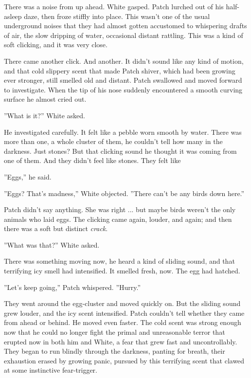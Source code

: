 \documentclass[12pt]{book}
\begin{document}
There was a noise from up ahead. White gasped. Patch lurched out of his half-asleep daze, then froze stiffly into place. This wasn't one of the usual underground noises that they had almost gotten accustomed to %
whispering drafts of air, the slow dripping of water, occasional distant rattling. This was a kind of soft clicking, and it was very close. 

There came another click. And another. It didn't sound like any kind of motion, and that cold slippery scent that made Patch shiver, which had been growing ever stronger, still smelled old and distant. Patch swallowed and moved forward to investigate. When the tip of his nose suddenly encountered a smooth curving surface he almost cried out.

''What is it?'' White asked.

He investigated carefully. It felt like a pebble worn smooth by water. There was more than one, a whole cluster of them, he couldn't tell how many in the darkness. Just stones? But that clicking sound %
he thought it was coming from one of them. And they didn't feel like stones. They felt like %

''Eggs,'' he said.

''Eggs? That's madness,'' White objected. ''There can't be any birds down here.''

Patch didn't say anything. She was right ... but maybe birds weren't the only animals who laid eggs. The clicking came again, louder, and again; and then there was a soft but distinct {\it crack}.

''What was that?'' White asked.

There was something moving now, he heard a kind of sliding sound, and that terrifying icy smell had intensified. It smelled fresh, now. The egg had hatched.

''Let's keep going,'' Patch whispered. ''Hurry.''

They went around the egg-cluster and moved quickly on. But the sliding sound grew louder, and the icy scent intensified. Patch couldn't tell whether they came from ahead or behind. He moved even faster. The cold scent was strong enough now that he could no longer fight the primal and unreasonable terror that erupted now in both him and White, a fear that grew fast and uncontrollably. They began to run blindly through the darkness, panting for breath, their exhaustion erased by growing panic, pursued by this terrifying scent that clawed at some instinctive fear-trigger.
\end{document}
